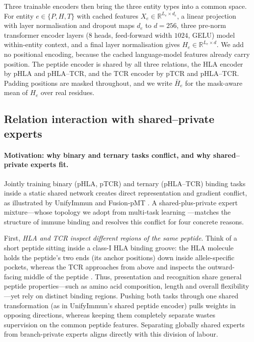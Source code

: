\documentclass[webpdf,modern,large,namedate]{oup-authoring-template}
\theoremstyle{thmstyleone}
\theoremstyle{thmstyletwo}
\theoremstyle{thmstylethree}
\newcommand{\PH}{pHLA}
\newcommand{\PT}{pTCR}
\newcommand{\PHT}{pHLA--TCR}
\newcommand{\dmodel}{d}
\begin{document}
Three trainable encoders then bring the three entity types into a common space.
For entity $e\in\{P,H,T\}$ with cached features $X_e\in\mathbb{R}^{L_e\times
d_e}$, a linear projection with layer normalisation and dropout maps $d_e$ to
$\dmodel=256$, three pre-norm transformer encoder layers
($8$ heads, feed-forward width $1024$, GELU) model within-entity context, and a
final layer normalisation gives $H_e\in\mathbb{R}^{L_e\times \dmodel}$. We add
no positional encoding, because the cached language-model features already
carry position. The peptide encoder is shared by all three relations, the HLA
encoder by \PH{} and \PHT{}, and the TCR encoder by \PT{} and \PHT{}. Padding
positions are masked throughout, and we write $\bar H_e$ for the mask-aware
mean of $H_e$ over real residues.

\subsection{Relation interaction with shared--private
experts}\label{sec:method:moe}

\paragraph{Motivation: why binary and ternary tasks conflict, and why shared--private experts fit.}
Jointly training binary (\PH{}, \PT{}) and ternary (\PHT{}) binding tasks inside
a static shared network creates direct representation and gradient conflict, as
illustrated by UnifyImmun \citep{yu2025unifyimmun} and Fusion-pMT
\citep{ma2025fusionpmt}. A shared-plus-private expert mixture---whose topology
we adopt from multi-task learning \citep{tang2020ple}---matches the structure
of immune binding and resolves this conflict for four concrete reasons.

First, \emph{HLA and TCR inspect different regions of the same peptide}.
Think of a short peptide sitting inside a class-I HLA binding groove: the HLA
molecule holds the peptide's two ends (its anchor positions) down inside
allele-specific pockets, whereas the TCR approaches from above and inspects the
outward-facing middle of the peptide \citep{rudolph2006structural}. Thus,
presentation and recognition share general peptide properties---such as amino
acid composition, length and overall flexibility---yet rely on distinct binding
regions. Pushing both tasks through one shared transformation (as in
UnifyImmun's shared peptide encoder) pulls weights in opposing directions,
whereas keeping them completely separate wastes supervision on the common
peptide features. Separating globally shared experts from branch-private
experts aligns directly with this division of labour.
\end{document}
